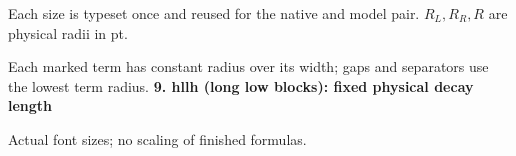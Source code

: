 \documentclass{article}
\newcommand\High{\frac{\displaystyle\sum_{k=1}^n x_k}{1+\frac pq}}
\newcommand\Mark[1]{\directlua{grid.mark(#1)}}
\begin{document}
\par\medskip
Each size is typeset once and reused for the native and model pair. $R_L,R_R,R$ are physical radii in pt.\par
Each marked term has constant radius over its width; gaps and separators use the lowest term radius.
\newpage
{\Large\bfseries 9. hllh (long low blocks): fixed physical decay length}\par\medskip
{} Actual font sizes; no scaling of finished formulas.\par\medskip
\end{document}
